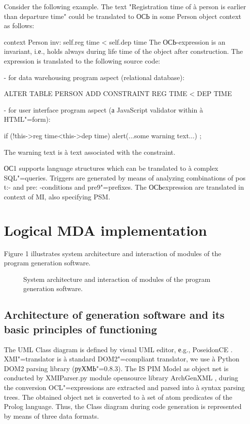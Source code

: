 \documentclass{intech}
\begin{document}
Consider the following example. The text "Registration time of à person is earlier than departure time" could be translated to ОСЬ in some Person object context as follows:

context Person inv:
self.reg time < self.dep time
The ОСЬ-expression is an invariant, i.е., holds always
during life time of the object after construction.
The expression is translated to the following source
code:

- for data warehousing program aspect (relational database):

ALTER TABLE PERSON
ADD CONSTRAINT
REG TIME < DEP TIME

- for user interface program aspect (а JavaScript validator within à HTML"=form):

if (!this->reg time<this->dep time) { alert(...some warning text...) };

The warning text is à text associated with the constraint.

ОС1 supports language structures which can be translated to à complex SQL"=queries. Triggers are generated by means of analyzing combinations of pos t:- and pre: -conditions and pre9"=prefixes. The ОСЬexpression are translated in context of MI, also specifying PSM.

\section{Logical MDA implementation}
\label{sec:log-MDA-impl}

Figure 1 illustrates system architecture and interaction of modules of the program generation software.

\begin{figure}[htb]
  \centering

  \caption[Generator architecture]{System architecture and interaction of modules of the program generation software.}
  \label{fig:gen-arch}
\end{figure}

\subsection{Architecture of generation software and its basic principles of functioning}
\label{sec:basic-func}

The UML Class diagram is defined by visual UML editor, е.g., PoseidonCE \cite{b4}. XMI"=translator is à standard DOM2"=compliant translator, we use à Python DOM2 parsing library (руХМЬ"=0.8.3). The IS PIM Model as object net is conducted by XMIParser.py module opensource library ArchGenXML \cite{b5}, during the conversion OCL"=expressions are extracted and parsed into à syntax parsing trees. The obtained object net is converted to à set of atom predicates of the Prolog language. Thus, the Class diagram during code generation is represented by means of three data formats.
\end{document}
